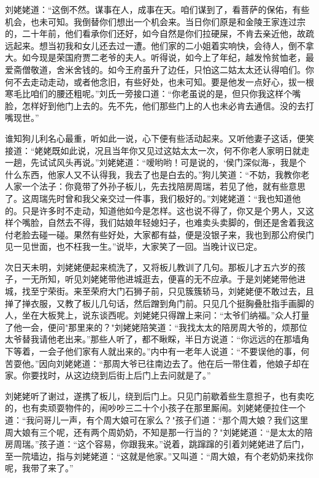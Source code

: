 刘姥姥道：“这倒不然。谋事在人，成事在天。咱们谋到了，看菩萨的保佑，有些机会，也未可知。我倒替你们想出一个机会来。当日你们原是和金陵王家连过宗的，二十年前，他们看承你们还好，如今自然是你们拉硬屎，不肯去亲近他，故疏远起来。想当初我和女儿还去过一遭。他们家的二小姐着实响快，会待人，倒不拿大。如今现是荣国府贾二老爷的夫人。听得说，如今上了年纪，越发怜贫恤老，最爱斋僧敬道，舍米舍钱的。如今王府虽升了边任，只怕这二姑太太还认得咱们。你何不去走动走动，或者他念旧，有些好处，也未可知。要是他发一点好心，拔一根寒毛比咱们的腰还粗呢。”刘氏一旁接口道：“你老虽说的是，但只你我这样个嘴脸，怎样好到他门上去的。先不先，他们那些门上的人也未必肯去通信。没的去打嘴现世。”

谁知狗儿利名心最重，听如此一说，心下便有些活动起来。又听他妻子这话，便笑接道：“姥姥既如此说，况且当年你又见过这姑太太一次，何不你老人家明日就走一趟，先试试风头再说。”刘姥姥道：“嗳哟哟！可是说的，`侯门深似海-，我是个什么东西，他家人又不认得我，我去了也是白去的。”狗儿笑道：“不妨，我教你老人家一个法子：你竟带了外孙子板儿，先去找陪房周瑞，若见了他，就有些意思了。这周瑞先时曾和我父亲交过一件事，我们极好的。”刘姥姥道：“我也知道他的。只是许多时不走动，知道他如今是怎样。这也说不得了，你又是个男人，又这样个嘴脸，自然去不得，我们姑娘年轻媳妇子，也难卖头卖脚的，倒还是舍着我这付老脸去碰一碰。果然有些好处，大家都有益，便是没银子来，我也到那公府侯门见一见世面，也不枉我一生。”说毕，大家笑了一回。当晚计议已定。

次日天未明，刘姥姥便起来梳洗了，又将板儿教训了几句。那板儿才五六岁的孩子，一无所知，听见刘姥姥带他进城逛去，便喜的无不应承。于是刘姥姥带他进城，找至宁荣街。来至荣府大门石狮子前，只见簇簇轿马，刘姥姥便不敢过去，且掸了掸衣服，又教了板儿几句话，然后蹭到角门前。只见几个挺胸叠肚指手画脚的人，坐在大板凳上，说东谈西呢。刘姥姥只得蹭上来问：“太爷们纳福。”众人打量了他一会，便问"那里来的？"刘姥姥陪笑道：“我找太太的陪房周大爷的，烦那位太爷替我请他老出来。”那些人听了，都不瞅睬，半日方说道：“你远远的在那墙角下等着，一会子他们家有人就出来的。”内中有一老年人说道：“不要误他的事，何苦耍他。”因向刘姥姥道：“那周大爷已往南边去了。他在后一带住着，他娘子却在家。你要找时，从这边绕到后街上后门上去问就是了。”

刘姥姥听了谢过，遂携了板儿，绕到后门上。只见门前歇着些生意担子，也有卖吃的，也有卖顽耍物件的，闹吵吵三二十个小孩子在那里厮闹。刘姥姥便拉住一个道：“我问哥儿一声，有个周大娘可在家么？"孩子们道：“那个周大娘？我们这里周大娘有三个呢，还有两个周奶奶，不知是那一行当的？"刘姥姥道：“是太太的陪房周瑞。”孩子道：“这个容易，你跟我来。”说着，跳蹿蹿的引着刘姥姥进了后门，至一院墙边，指与刘姥姥道：“这就是他家。”又叫道：“周大娘，有个老奶奶来找你呢，我带了来了。”


